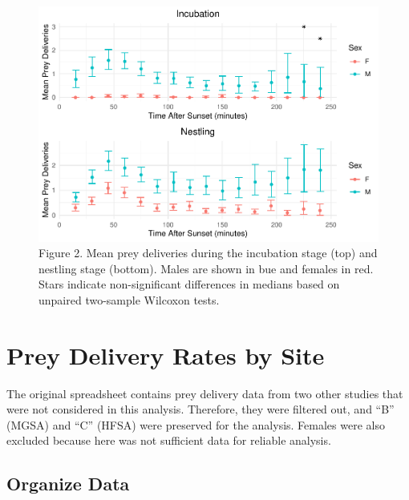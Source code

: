 \documentclass[]{article}
\newenvironment{Shaded}{\begin{snugshade}}{\end{snugshade}}
\newcommand{\KeywordTok}[1]{\textcolor[rgb]{0.13,0.29,0.53}{\textbf{#1}}}
\newcommand{\NormalTok}[1]{#1}
\newcommand{\OperatorTok}[1]{\textcolor[rgb]{0.81,0.36,0.00}{\textbf{#1}}}
\newcommand{\StringTok}[1]{\textcolor[rgb]{0.31,0.60,0.02}{#1}}
\begin{document}
\begin{figure}
\centering
\includegraphics{../manuscript/figures/plot_sex-1.pdf}
\caption{Figure 2. Mean prey deliveries during the incubation stage
(top) and nestling stage (bottom). Males are shown in bue and females in
red. Stars indicate non-significant differences in medians based on
unpaired two-sample Wilcoxon tests.}
\end{figure}

\hypertarget{prey-delivery-rates-by-site}{%
\section{Prey Delivery Rates by
Site}\label{prey-delivery-rates-by-site}}

The original spreadsheet contains prey delivery data from two other
studies that were not considered in this analysis. Therefore, they were
filtered out, and ``B'' (MGSA) and ``C'' (HFSA) were preserved for the
analysis. Females were also excluded because here was not sufficient
data for reliable analysis.

\begin{Shaded}
\end{Shaded}

\hypertarget{organize-data-1}{%
\subsection{Organize Data}\label{organize-data-1}}
\end{document}
